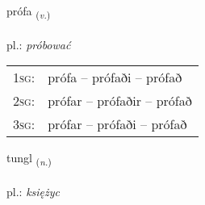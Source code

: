 \documentclass[frontgrid, backgrid]{flacards}\usepackage[]{graphicx}\usepackage[]{xcolor}
\begin{document}
\renewcommand{\blhead}{\vskip5pt {\small\bfseries\footnotesize Sagnorð | Verb }}
\renewcommand{\bcfoot}{\vskip5pt \hspace{2pt}{\small\bfseries\footnotesize 2K}}


{prófa \small{\textsubscript{(\textit{v.})}} \\[1ex] %
\textphonetic{[pʰrouːva]} \\
pl.: \emph{próbować} \\  [2ex]
\renewcommand*{\arraystretch}{0.8}
\begin{tabular}{p{1cm}l}
\textsc{1sg}: & prófa -- prófaði -- prófað \\ 
\textsc{2sg}: & prófar -- prófaðir -- prófað \\ 
\textsc{3sg}: & prófar -- prófaði -- prófað \\ 
\end{tabular}
}

\renewcommand{\flhead}{\vskip5pt \fboxsep=0pt {\small\bfseries\footnotesize Nafnorð | Noun}}
\renewcommand{\fcfoot}{\vskip5pt \fboxsep=0pt \hspace{2pt}{\small\bfseries\footnotesize 2K}}

\renewcommand{\blhead}{\vskip5pt {\small\bfseries\footnotesize Nafnorð | Noun }}
\renewcommand{\bcfoot}{\vskip5pt \hspace{2pt}{\small\bfseries\footnotesize 2K}}


{tungl \small{\textsubscript{(\textit{n.})}} \\[1ex] %
\textphonetic{[tʰuŋl]} \\
pl.: \emph{księżyc} \\  [2ex]
\renewcommand*{\arraystretch}{0.8}
}

\renewcommand{\flhead}{\vskip5pt \fboxsep=0pt {\small\bfseries\footnotesize Atviksorð | Adverb}}
\renewcommand{\fcfoot}{\vskip5pt \fboxsep=0pt \hspace{2pt}{\small\bfseries\footnotesize 2K}}
\end{document}
